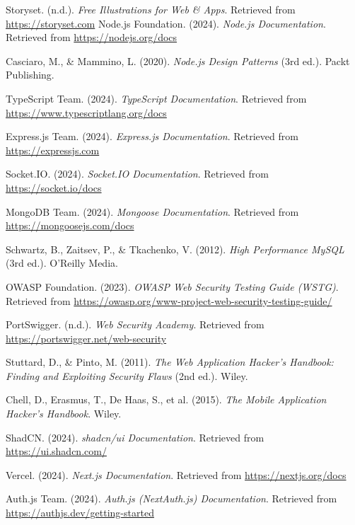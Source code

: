 \begin{thebibliography}{9}

    Storyset. (n.d.). \textit{Free Illustrations for Web \& Apps}. Retrieved from \url{https://storyset.com}
    Node.js Foundation. (2024). \textit{Node.js Documentation}. Retrieved from \url{https://nodejs.org/docs}
    
    Casciaro, M., \& Mammino, L. (2020). \textit{Node.js Design Patterns} (3rd ed.). Packt Publishing.
    
    TypeScript Team. (2024). \textit{TypeScript Documentation}. Retrieved from \url{https://www.typescriptlang.org/docs}
    
    Express.js Team. (2024). \textit{Express.js Documentation}. Retrieved from \url{https://expressjs.com}
    
    Socket.IO. (2024). \textit{Socket.IO Documentation}. Retrieved from \url{https://socket.io/docs}
    
    MongoDB Team. (2024). \textit{Mongoose Documentation}. Retrieved from \url{https://mongoosejs.com/docs}
    
    Schwartz, B., Zaitsev, P., \& Tkachenko, V. (2012). \textit{High Performance MySQL} (3rd ed.). O'Reilly Media.

    OWASP Foundation. (2023). \textit{OWASP Web Security Testing Guide (WSTG)}. Retrieved from \url{https://owasp.org/www-project-web-security-testing-guide/}

    PortSwigger. (n.d.). \textit{Web Security Academy}. Retrieved from \url{https://portswigger.net/web-security}

    Stuttard, D., \& Pinto, M. (2011). \textit{The Web Application Hacker's Handbook: Finding and Exploiting Security Flaws} (2nd ed.). Wiley.

    Chell, D., Erasmus, T., De Haas, S., et al. (2015). \textit{The Mobile Application Hacker's Handbook}. Wiley.

    ShadCN. (2024). \textit{shadcn/ui Documentation}. Retrieved from \url{https://ui.shadcn.com/}

    Vercel. (2024). \textit{Next.js Documentation}. Retrieved from \url{https://nextjs.org/docs}

    Auth.js Team. (2024). \textit{Auth.js (NextAuth.js) Documentation}. Retrieved from \url{https://authjs.dev/getting-started}


\end{thebibliography}
